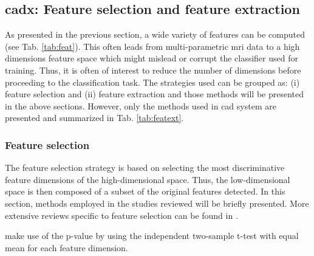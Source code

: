 \subsection{\ac{cadx}: Feature selection and feature extraction} \label{subsec:featureselectionextraction}

As presented in the previous section, a wide variety of features can be computed (see Tab. \ref{tab:feat}). This often leads from multi-parametric \ac{mri} data to a high dimensions feature space which might mislead or corrupt the classifier used for training. Thus, it is often of interest to reduce the number of dimensions before proceeding to the classification task. The strategies used can be grouped as: (i) feature selection and (ii) feature extraction and those methods will be presented in the above sections. However, only the methods used in \ac{cad} system are presented and summarized in Tab. \ref{tab:featext}.

\subsubsection{Feature selection}\label{subsubsec:featsel}

The feature selection strategy is based on selecting the most discriminative feature dimensions of the high-dimensional space. Thus, the low-dimensional space is then composed of a subset of the original features detected. In this section, methods employed in the studies reviewed will be briefly presented. More extensive reviews specific to feature selection can be found in \cite{Saeys2007}.

\cite{Niaf2011,Niaf2012} make use of the p-value by using the independent two-sample t-test with equal mean for each feature dimension. %
%
%

